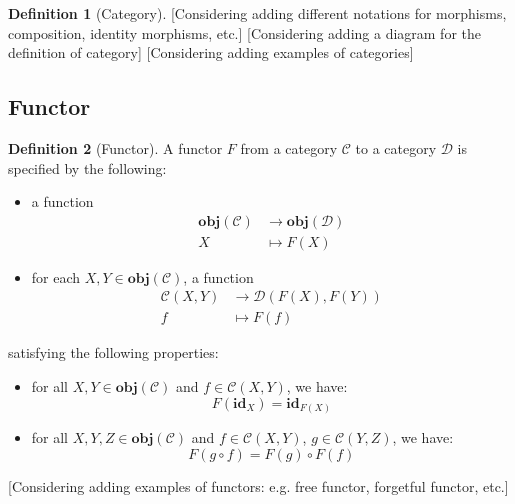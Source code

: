 \documentclass[12pt,twoside,a4paper]{report}
\theoremstyle{definition}
\newtheorem*{definition*}{Definition}
\begin{document}
\begin{definition*}[Category]
            [Considering adding different notations for morphisms, composition, identity morphisms, etc.]
            [Considering adding a diagram for the definition of category]
            [Considering adding examples of categories]
            
        \end{definition*}

        \subsection{Functor}
        \begin{definition*}[Functor]
            A functor $F$ from a category $\mathcal{C}$ to a category $\mathcal{D}$ is specified by the following:
            \begin{itemize}
                \item 
                    a function 
                    \[\begin{aligned}
                        \textbf{obj}(\mathcal{C}) &\to \textbf{obj}(\mathcal{D}) \\
                        X &\mapsto F(X)
                    \end{aligned}\]

                \item 
                    for each $X, Y \in \textbf{obj}(\mathcal{C})$, a function 
                    \[\begin{aligned}
                        \mathcal{C}{(X,Y)} &\to \mathcal{D}{(F(X),F(Y))} \\
                        f &\mapsto F(f)
                    \end{aligned}\]
            \end{itemize}
            satisfying the following properties:
            \begin{itemize}
                \item 
                    for all $X, Y \in \textbf{obj}(\mathcal{C})$ and $f \in \mathcal{C}{(X,Y)}$, we have:
                    \begin{equation} \label{law: functor_id}
                        F(\textbf{id}_X) = \textbf{id}_{F(X)}
                    \end{equation}
                \item
                    for all $X, Y, Z \in \textbf{obj}(\mathcal{C})$ and $f \in \mathcal{C}{(X,Y)}$, $g \in \mathcal{C}{(Y,Z)}$, we have:
                    \begin{equation} \label{law: functor_comp}
                        F(g \circ f) = F(g) \circ F(f)
                    \end{equation}
            \end{itemize}
        \end{definition*}
        [Considering adding examples of functors: e.g. free functor, forgetful functor, etc.]
\end{document}
